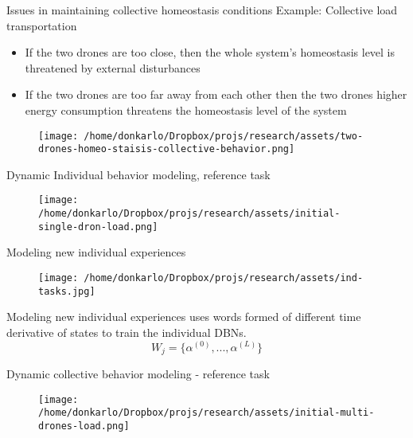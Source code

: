 \documentclass[unknownkeysallowed]{beamer}
\begin{document}
	\begin{frame}{Issues in maintaining collective homeostasis conditions}
		Example: Collective load transportation
		\begin{itemize}
			\item If the two drones are too close, then the whole system's homeostasis level is threatened by external disturbances
			\item If the two drones are too far away from each other then the two drones higher energy consumption threatens the homeostasis level of the system
		\end{itemize}
		\begin{figure}
			\texttt{[image: /home/donkarlo/Dropbox/projs/research/assets/two-drones-homeo-staisis-collective-behavior.png]}
			\caption{}
		\end{figure}
	\end{frame}
	
	\begin{frame}{Dynamic Individual behavior modeling, reference task}
		\begin{figure}
			\texttt{[image: /home/donkarlo/Dropbox/projs/research/assets/initial-single-dron-load.png]}
			\caption{}
		\end{figure}
	\end{frame}

	\begin{frame}{Modeling new individual experiences}
		\begin{figure}
			\texttt{[image: /home/donkarlo/Dropbox/projs/research/assets/ind-tasks.jpg]}
			\caption{}
		\end{figure}
	\end{frame}

	\begin{frame}{Modeling new individual experiences}
		 \cite{kanapram-2020-collective-awareness-for-abnormality-detection-in-connected-autonomous-vehicles} uses words formed of different time derivative of states to train the individual DBNs.
		 \begin{equation}
		 	W_j = \{\alpha^{(0)},...,\alpha^{(L)}\}
		 \end{equation}
	\end{frame}

	\begin{frame}{Dynamic collective behavior modeling - reference task}  
		\begin{figure}
			\texttt{[image: /home/donkarlo/Dropbox/projs/research/assets/initial-multi-drones-load.png]}
			\caption{}
		\end{figure}
	\end{frame}
\end{document}

